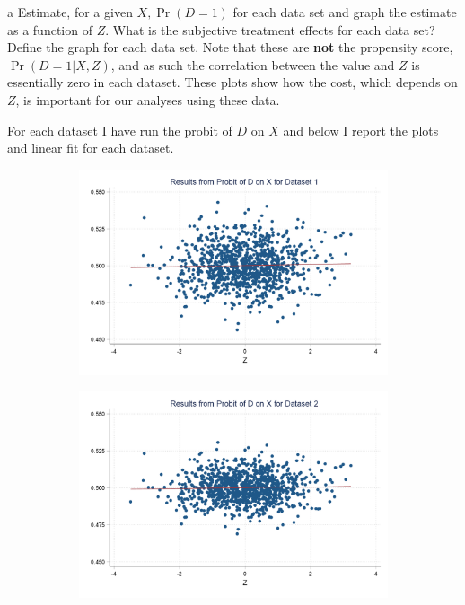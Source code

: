 \documentclass{article}
\begin{document}
 
\begin{problem}{a}
Estimate, for a given $X, \operatorname{Pr}(D=1)$ for each data set and graph the estimate as a function of $Z$. What is the subjective treatment effects for each data set? Define the graph for each data set. Note that these are \textbf{not} the propensity score, $\operatorname{Pr}(D=1|X,Z)$, and as such the correlation between the value and $Z$ is essentially zero in each dataset. These plots show how the cost, which depends on $Z$, is important for our analyses using these data.
\end{problem}
\begin{solution}
For each dataset I have run the probit of $D$ on $X$ and below I report the plots and linear fit for each dataset.
\begin{figure}[H]
    \centering
    \caption{$P(D=1|X)$ for each of the five datasets}
    \begin{subfigure}[b]{0.43\textwidth}
        \centering
        \includegraphics[width=\textwidth]{ps2Heckman/figures/q8_parta_d1.png}
    \end{subfigure}
    \begin{subfigure}[b]{0.43\textwidth}
        \centering
        \includegraphics[width=\textwidth]{ps2Heckman/figures/q8_parta_d2.png}

\end{subfigure}
\end{figure}
\end{solution}
\end{document}
